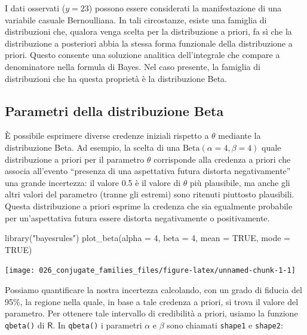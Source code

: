 \documentclass[
  10pt,
  italian,
  a4paper,
  extrafontsizes,onecolumn,openright
  ]{memoir}
\newenvironment{Shaded}{\begin{snugshade}}{\end{snugshade}}
\newcommand{\AttributeTok}[1]{\textcolor[rgb]{0.77,0.63,0.00}{#1}}
\newcommand{\ConstantTok}[1]{\textcolor[rgb]{0.00,0.00,0.00}{#1}}
\newcommand{\DecValTok}[1]{\textcolor[rgb]{0.00,0.00,0.81}{#1}}
\newcommand{\FunctionTok}[1]{\textcolor[rgb]{0.00,0.00,0.00}{#1}}
\newcommand{\NormalTok}[1]{#1}
\newcommand{\StringTok}[1]{\textcolor[rgb]{0.31,0.60,0.02}{#1}}
\newcommand{\R}{\textsf{R}} %
\theoremstyle{definition}
\theoremstyle{definition}
\theoremstyle{definition}
\theoremstyle{definition}
\theoremstyle{remark}
\begin{document}
I dati osservati (\(y = 23\)) possono essere considerati la manifestazione di una variabile casuale Bernoulliana. In tali circostanze, esiste una famiglia di distribuzioni che, qualora venga scelta per la distribuzione a priori, fa sì che la distribuzione a posteriori abbia la stessa forma funzionale della distribuzione a priori. Questo consente una soluzione analitica dell'integrale che compare a denominatore nella formula di Bayes. Nel caso presente, la famiglia di distribuzioni che ha questa proprietà è la distribuzione Beta.

\hypertarget{parametri-della-distribuzione-beta}{%
\subsection{Parametri della distribuzione Beta}\label{parametri-della-distribuzione-beta}}

È possibile esprimere diverse credenze iniziali rispetto a \(\theta\) mediante la distribuzione Beta. Ad esempio, la scelta di una \(\mbox{Beta}(\alpha = 4, \beta = 4)\) quale distribuzione a priori per il parametro \(\theta\) corrisponde alla credenza a priori che associa all'evento ``presenza di una aspettativa futura distorta negativamente'' una grande incertezza: il valore 0.5 è il valore di \(\theta\) più plausibile, ma anche gli altri valori del parametro (tranne gli estremi) sono ritenuti piuttosto plausibili. Questa distribuzione a priori esprime la credenza che sia egualmente probabile per un'aspettativa futura essere distorta negativamente o positivamente.

\begin{Shaded}
\begin{Highlighting}[]
\FunctionTok{library}\NormalTok{(}\StringTok{"bayesrules"}\NormalTok{)}
\FunctionTok{plot\_beta}\NormalTok{(}\AttributeTok{alpha =} \DecValTok{4}\NormalTok{, }\AttributeTok{beta =} \DecValTok{4}\NormalTok{, }\AttributeTok{mean =} \ConstantTok{TRUE}\NormalTok{, }\AttributeTok{mode =} \ConstantTok{TRUE}\NormalTok{)}
\end{Highlighting}
\end{Shaded}

\begin{center}\texttt{[image: 026\_conjugate\_families\_files/figure-latex/unnamed-chunk-1-1]} \end{center}

Possiamo quantificare la nostra incertezza calcolando, con un grado di fiducia del 95\%, la regione nella quale, in base a tale credenza a priori, si trova il valore del parametro. Per ottenere tale intervallo di credibilità a priori, usiamo la funzione \texttt{qbeta()} di \(\R\). In \texttt{qbeta()} i parametri \(\alpha\) e \(\beta\) sono chiamati \texttt{shape1} e \texttt{shape2}:
\end{document}
